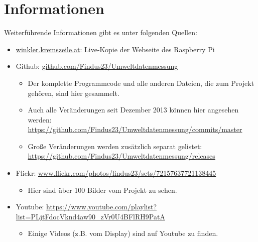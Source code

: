 \documentclass[12pt,a5paper,landscape,DIV=20]{scrartcl}
\author{Lukas Winkler}
\begin{document}
\vspace*{\fill}
\section*{Informationen}

Weiterführende Informationen gibt es unter folgenden Quellen:
\begin{itemize}
\item \href{http://winkler.kremszeile.at/}{winkler.kremszeile.at}: Live-Kopie der Webseite des Raspberry Pi
\item Github: \href{https://github.com/Findus23/Umweltdatenmessung}{github.com/Findus23/Umweltdatenmessung}
	\begin{itemize}
	\item Der komplette Programmcode und alle anderen Dateien, die zum Projekt gehören, sind hier gesammelt.
	\item Auch alle Veränderungen seit Dezember 2013 können hier angesehen werden:  \url{https://github.com/Findus23/Umweltdatenmessung/commits/master}
	\item Große Veränderungen werden zusätzlich separat gelistet: \url{https://github.com/Findus23/Umweltdatenmessung/releases}
	\end{itemize}
\item Flickr: \href{https://www.flickr.com/photos/findus23/sets/72157637721138445/}{www.flickr.com/photos/findus23/sets/72157637721138445}
	\begin{itemize}
	\item Hier sind über 100 Bilder vom Projekt zu sehen.
	\end{itemize}
\item Youtube: \url{https://www.youtube.com/playlist?list=PLjtFdocVknd4aw90_zVr0U4BFlRH9PatA}
	\begin{itemize}
	\item Einige Videos (z.B. vom Display) sind auf Youtube zu finden.
	\end{itemize}
\end{itemize}
\vspace*{\fill}
\end{document}
